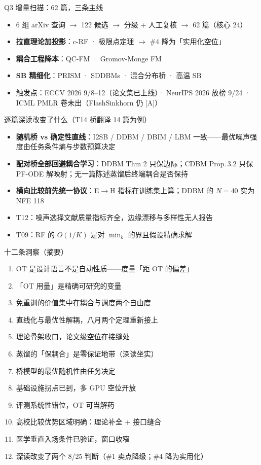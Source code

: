 \documentclass[10pt,aspectratio=169]{beamer}
\begin{document}
\begin{frame}{Q3 增量扫描：62 篇，三条主线}
\begin{itemize}
\item 6 组 arXiv 查询 $\to$ 122 候选 $\to$ 分级 + 人工复核 $\to$ 62 篇（核心 24）
\item \textbf{拉直理论加投影}：c-RF · 极限点定理 $\to$ \#4 降为「实用化空位」
\item \textbf{耦合工程降本}：QC-FM · Gromov-Monge FM
\item \textbf{SB 精细化}：PRISM · SDDBMs · 混合分布桥 · 高温 SB
\item 触发点：ECCV 2026 9/8--12（论文集已上线）· NeurIPS 2026 放榜 9/24 · ICML PMLR 卷未出（FlashSinkhorn 仍 [A]）
\end{itemize}
\end{frame}

\begin{frame}{逐篇深读改变了什么（T14 桥翻译 14 篇为例）}
\begin{itemize}
\item \textbf{随机桥 vs 确定性直线}：I2SB / DDBM / DBIM / LBM 一致——最优噪声强度由任务条件熵与步数预算决定
\item \textbf{配对桥全部回避耦合学习}：DDBM Thm 2 只保边际；CDBM Prop.\,3.2 只保 PF-ODE 解映射；\textcolor{hl}{无一篇陈述蒸馏后终端耦合是否保持}
\item \textbf{横向比较前先统一协议}：E$\to$H 指标在训练集上算；DDBM 的 $N{=}40$ 实为 NFE 118
\item T12：噪声选择文献质量指标齐全，\textcolor{bad}{边缘漂移与多样性无人报告}
\item T09：RF 的 $O(1/K)$ 是对 $\min_k$ 的界且假设精确求解
\end{itemize}
\end{frame}

\begin{frame}{十二条洞察（摘要）}
\small
\begin{enumerate}
\item OT 是设计语言不是自动性质——度量「距 OT 的偏差」
\item 「OT 用量」是精确可研究的变量
\item 免重训的价值集中在耦合与调度两个自由度
\item 直线化与最优性解耦，八月两个定理重新接上
\item 理论骨架收口，论文级空位在接缝处
\item 蒸馏的「保耦合」是零保证地带（深读坐实）
\item 桥模型的最优随机性由任务决定
\item 基础设施拐点已到，多 GPU 空位开放
\item 评测系统性错位，OT 可当解药
\item 高校比较优势区域明确：理论补全 + 接口缝合
\item 医学垂直入场条件已验证，窗口收窄
\item 深读改变了两个 8/25 判断（\#1 卖点降级；\#4 降为实用化）
\end{enumerate}
\end{frame}
\end{document}
